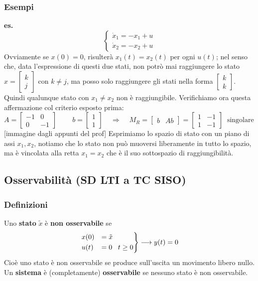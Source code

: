 \subsubsection{Esempi}
\textbf{es.} 
\[
    \begin{cases}
        \dot{x}_1 = -x_1 + u\\
        \dot{x}_2 = -x_2 +u
    \end{cases}
\]
Ovviamente se $x(0) = 0$, risulterà $x_1(t) = x_2(t)$ per ogni $u(t)$; nel senso che, data l'espressione di questi due stati, non potrò mai raggiungere lo stato $x = \left[\begin{matrix}
    k\\j
\end{matrix}\right]$ con $k\neq j$, ma posso solo raggiungere gli stati nella forma $\left[\begin{matrix}
    k\\k
\end{matrix}\right]$.\newline
Quindi qualunque stato con $x_1 \neq x_2$ non è raggiungibile. Verifichiamo ora questa affermazione col criterio esposto prima:
\[
    A = \left[\begin{matrix}
        -1 & 0 \\ 0 & -1
    \end{matrix}\right] \;\;\;\;\;\;\;\; b = \left[\begin{matrix}
        1\\1
    \end{matrix}\right] \;\;\;\;\Longrightarrow \;\;\;\;M_R = \left[\begin{matrix}
        b & Ab
    \end{matrix}\right] = \left[\begin{matrix}
        1 &-1 \\1 & -1
    \end{matrix}\right] \;\;\text{singolare}\;
\]
[immagine dagli appunti del prof]\newline
Esprimiamo lo spazio di stato con un piano di assi $x_1, x_2$, notiamo che lo stato non può muoversi liberamente in tutto lo spazio, ma è vincolata alla retta $x_1 = x_2$ che è il suo sottospazio di raggiungibilità.
\subsection{Osservabilità (SD LTI a TC SISO)}
\subsubsection{Definizioni}
Uno \textbf{stato} $\tilde{x}$ è \textbf{non osservabile} se 
\[
    \begin{rcases}
        x(0) &= \tilde{x}\\
        u(t) &= 0 \;\;\;t \geq 0
    \end{rcases} \longrightarrow y(t) = 0
\]
Cioè uno stato è non osservabile se produce sull'uscita un movimento libero nullo.\newline
\newline
Un \textbf{sistema} è (completamente) \textbf{osservabile} se nessuno stato è non osservabile.
